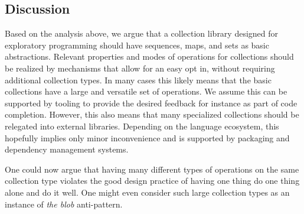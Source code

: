 \documentclass[sigconf, 10pt]{acmart}
\begin{document}
\subsection{Discussion}

Based on the analysis above,
we argue that a collection library designed for exploratory programming
should have sequences, maps, and sets as basic abstractions.
Relevant properties and modes of operations for collections should be
realized by mechanisms that allow for an easy opt in,
without requiring additional collection types.
In many cases this likely means
that the basic collections have a large and versatile set of operations.
We assume this can be supported by tooling to provide the desired feedback
for instance as part of code completion.
However, this also means that many specialized collections should be relegated
into external libraries.
Depending on the language ecosystem,
this hopefully implies only minor inconvenience
and is supported by packaging and dependency management systems.

One could now argue that having many different types of operations
on the same collection type violates the good design practice
of having one thing do one thing alone and do it well.
One might even consider such large collection types as
an instance of \emph{the blob} anti-pattern.\citep{brown1998antipatterns}
\end{document}
